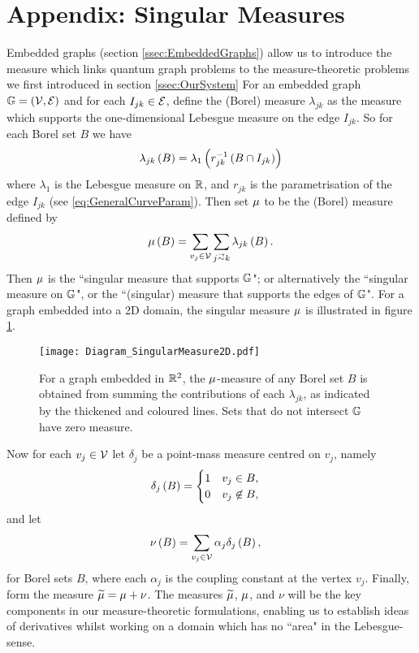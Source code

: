 \section{Appendix: Singular Measures} \label{app:SingularMeasures}
Embedded graphs (section \ref{ssec:EmbeddedGraphs}) allow us to introduce the measure which links quantum graph problems to the measure-theoretic problems we first introduced in section \ref{ssec:OurSystem}
For an embedded graph $\mathbb{G} = \left( \mathcal{V},\mathcal{E} \right)$ and for each $I_{jk}\in \mathcal{E}$, define the (Borel) measure $\lambda_{jk}$ as the measure which supports the one-dimensional Lebesgue measure on the edge $I_{jk}$.
So for each Borel set $B$ we have
\begin{align*}
	\lambda_{jk}\left( B \right) = \lambda_{1}\left( r_{jk}^{-1}\left( B \cap I_{jk} \right) \right)
\end{align*}
where $\lambda_1$ is the Lebesgue measure on $\mathbb{R}$, and $r_{jk}$ is the parametrisation of the edge $I_{jk}$ (see \eqref{eq:GeneralCurveParam}).
Then set $\mu$ to be the (Borel) measure defined by
\begin{align*}
	\ddmes\bracs{B} = \sum_{v_j\in \vertSet}\sum_{j\conLeft k} \lambda_{jk}\bracs{B}.
\end{align*}
Then $\mu$ is the ``singular measure that supports $\mathbb{G}$"; or alternatively the ``singular measure on $\mathbb{G}$", or the ``(singular) measure that supports the edges of $\mathbb{G}$".
For a graph embedded into a 2D domain, the singular measure $\mu$ is illustrated in figure \ref{fig:Diagram_SingularMeasure2D}.
\begin{figure}[b!]
	\centering
	\texttt{[image: Diagram\_SingularMeasure2D.pdf]}
	\caption{\label{fig:Diagram_SingularMeasure2D} For a graph embedded in $\mathbb{R}^2$, the $\mu$-measure of any Borel set $B$ is obtained from summing the contributions of each $\lambda_{jk}$, as indicated by the thickened and coloured lines.
	Sets that do not intersect $\mathbb{G}$ have zero measure.}
\end{figure} \newline

Now for each $v_j\in\mathcal{V}$ let $\delta_j$ be a point-mass measure centred on $v_j$, namely
\begin{align*}
	\delta_j\left( B \right) &= \begin{cases} 1 & v_j\in B, \\ 0 & v_j\not\in B, \end{cases}
\end{align*}
and let
\begin{align*}
	\nu\left( B \right) &= \sum_{v_j\in\mathcal{V}}\alpha_j\delta_j\left( B \right),
\end{align*}
for Borel sets $B$, where each $\alpha_j$ is the coupling constant at the vertex $v_j$.
Finally, form the measure $\widetilde{\mu} = \mu + \nu$.
The measures $\widetilde{\mu}$, $\mu$, and $\nu$ will be the key components in our measure-theoretic formulations, enabling us to establish ideas of derivatives whilst working on a domain which has no ``area" in the Lebesgue-sense.